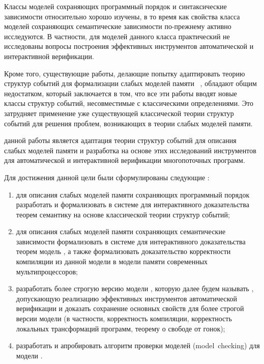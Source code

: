 Классы моделей сохраняющих программный порядок и синтаксические зависимости 
относительно хорошо изучены, в то время как свойства класса моделей 
сохраняющих семантические зависимости по-прежнему активно исследуются.
В частности, для моделей данного класса практический не исследованы
вопросы построения эффективных инструментов автоматической и интерактивной верификации. 

Кроме того, существующие работы, делающие попытку адаптировать 
теорию структур событий для формализации слабых моделей памяти%
~\autocite{Jeffrey-Riely:LICS16,PichonPharabod-Sewell:POPL16,Chakraborty-Vafeiadis:POPL19,Paviotti-al:ESOP20},
обладают общим недостатком, который заключается в том,
что все эти работы вводят новые классы структур событий, 
несовместимые с классическими определениями.
Это затрудняет применение уже существующей классической теории структур событий
для решения проблем, возникающих в теории слабых моделей памяти. 

{\aim} данной работы является адаптация теории структур событий
для описания слабых моделей памяти и разработка на основе этих исследований 
инструментов для автоматической и интерактивной верификации многопоточных программ. 

Для достижения данной цели были сформулированы следующие {\tasks}:
\begin{enumerate}[beginpenalty=10000] %
  \item для описания слабых моделей памяти сохраняющих программный порядок
    разработать и формализовать в системе для интерактивного доказательства теорем \coq
    семантику на основе классической теории структур событий; 
  \item для описания слабых моделей памяти сохраняющих семантические зависимости
    формализовать в системе для интерактивного доказательства теорем \coq
    модель \Wkm, а также формализовать доказательство корректности компиляции
    из данной модели в модели памяти современных мультипроцессоров;
  \item разработать более строгую версию модели \Wkm, которую далее будем называть \WkmS, 
    допускающую реализацию эффективных инструментов автоматической верификации
    и доказать сохранение основных свойств \Wkm для более строгой версии модели 
    (в частности, корректность компиляции, корректность локальных трансформаций программ, 
     теорему о свободе от гонок);
  \item разработать и апробировать алгоритм проверки моделей (model~checking) для модели \WkmS.
\end{enumerate}

